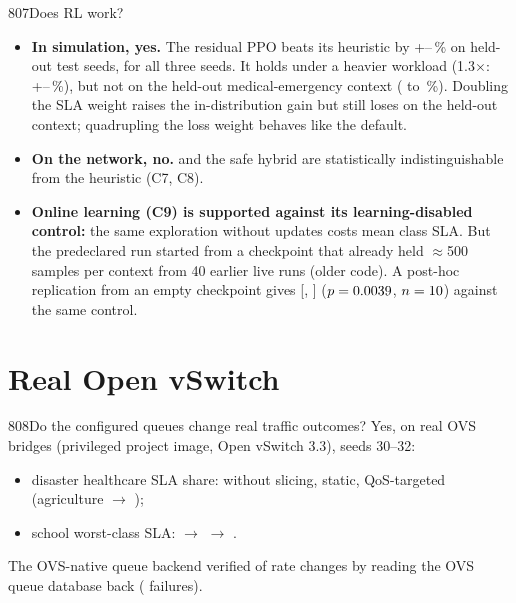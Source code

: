 \begin{qa}{807}{Does RL work?}
\begin{itemize}
\item \textbf{In simulation, yes.} The residual PPO beats its heuristic by +\NResDefaultRelMin--\NResDefaultRelMax\,\%
on held-out test seeds, for all three seeds. It holds under a heavier workload (1.3$\times$:
+\NResDefaultLoadMin--\NResDefaultLoadMax\,\%), but not on the held-out medical-emergency context
(\NResDefaultCtxMin{} to \NResDefaultCtxMax\,\%). Doubling the SLA weight raises the in-distribution gain but still
loses on the held-out context; quadrupling the loss weight behaves like the default.
\item \textbf{On the network, no.}  and the safe hybrid are statistically indistinguishable from the
heuristic (C7, C8).
\item \textbf{Online learning (C9) is supported against its learning-disabled control:} the same exploration without
updates costs \NFCNineDiff{} mean class SLA. But the predeclared run started from a checkpoint that already held
$\approx$500 samples per context from 40 earlier live runs (older code). A post-hoc replication from an empty
checkpoint gives \NPostFreshDiff{} [\NPostFreshLo, \NPostFreshHi] ($p=0.0039$, $n=10$) against the same
control.
\end{itemize}
\end{qa}

\section{Real Open vSwitch}

\begin{qa}{808}{Do the configured queues change real traffic outcomes?}
Yes, on real OVS bridges (privileged project image, Open vSwitch 3.3), seeds 30--32:
\begin{itemize}
\item disaster healthcare SLA share: \NOvsDisasterNoneHc{} without slicing, \NOvsDisasterStatHc{} static,
\NOvsDisasterAdHc{} QoS-targeted (agriculture \NOvsDisasterNoneAg{} $\rightarrow$ \NOvsDisasterAdAg);
\item school worst-class SLA: \NOvsSchoolNoneMin{} $\rightarrow$ \NOvsSchoolStatMin{} $\rightarrow$ \NOvsSchoolAdMin.
\end{itemize}
The OVS-native queue backend verified \NOvsBackendChanges{} of \NOvsBackendChanges{} rate changes by reading the OVS
queue database back (\NOvsBackendFailed{} failures).
\end{qa}

